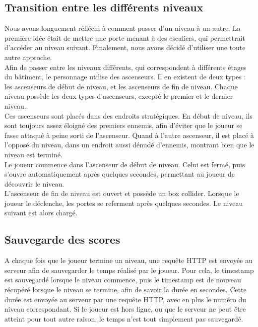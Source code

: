 \documentclass[12pt]{article}
\begin{document}
\subsection{Transition entre les différents niveaux}

Nous avons longuement réfléchi à comment passer d'un niveau à un autre. La première idée était de mettre une porte menant à des escaliers, qui permettrait d'accéder au niveau suivant. Finalement, nous avons décidé d'utiliser une toute autre approche.\\
Afin de passer entre les niveaux différents, qui correspondent à différents étages du bâtiment, le personnage utilise des ascenseurs.  Il en existent de deux types : les ascenseurs de début de niveau, et les ascenseurs de fin de niveau. Chaque niveau possède les deux types d'ascenseurs, excepté le premier et le dernier niveau.\\
Ces ascenseurs sont placés dans des endroits stratégiques. En début de niveau, ils sont toujours assez éloigné des premiers ennemis, afin d'éviter que le joueur se fasse attaqué à peine sorti de l'ascenseur. Quand à l'autre ascenseur, il est placé à l'opposé du niveau, dans un endroit aussi dénudé d'ennemis, montrant bien que le niveau est terminé.\\
Le joueur commence dans l'ascenseur de début de niveau. Celui est fermé, puis s'ouvre automatiquement après quelques secondes, permettant au joueur de découvrir le niveau.\\
L'ascenseur de fin de niveau est ouvert et possède un box collider. Lorsque le joueur le déclenche, les portes se referment après quelques secondes. Le niveau suivant est alors chargé.

\subsection{Sauvegarde des scores}

A chaque fois que le joueur termine un niveau, une requête HTTP est envoyée au serveur afin de sauvegarder le temps réalisé par le joueur. Pour cela, le timestamp est sauvegardé lorsque le niveau commence, puis le timestamp est de nouveau récupéré lorsque le niveau se termine, afin de savoir la durée en secondes. Cette durée est envoyée au serveur par une requête HTTP, avec en plus le numéro du niveau correspondant. Si le joueur est hors ligne, ou que le serveur ne peut être atteint pour tout autre raison, le temps n'est tout simplement pas sauvegardé.\\
\end{document}

